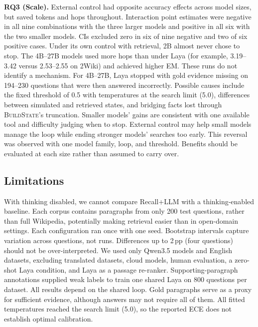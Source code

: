 \textbf{RQ3 (Scale).} External control had opposite accuracy effects across model sizes,
but saved tokens and hops throughout. Interaction point estimates were negative in
all nine combinations with the three larger models and positive in all six with the
two smaller models. CIs excluded zero in six of nine negative and two of six positive
cases. Under its own control with retrieval, 2B almost never chose to stop. The
4B--27B models used more hops than under Laya (for example,
3.19--3.42 versus 2.53--2.55 on 2Wiki) and achieved higher EM. These runs do not
identify a mechanism. For 4B--27B, Laya stopped with gold evidence missing on 194--230
questions that were then answered incorrectly. Possible
causes include the fixed threshold of 0.5 with temperatures at the search limit (5.0),
differences between simulated and retrieved states, and bridging facts lost through
\textsc{BuildState}'s truncation. Smaller models' gains are consistent with one available
tool and difficulty judging when to stop. External control may help small models manage
the loop while ending stronger models' searches too early. This reversal was observed
with one model family, loop, and threshold. Benefits should be evaluated at each size
rather than assumed to carry over.

\subsection{Limitations}
\label{sec:disc:limits}

With thinking disabled, we cannot compare Recall+LLM with a thinking-enabled
baseline. Each corpus contains paragraphs from only 200 test questions, rather than full
Wikipedia, potentially making retrieval easier than in open-domain settings. Each
configuration ran once with one seed. Bootstrap intervals capture variation across
questions, not runs. Differences up to 2\,pp (four questions) should not be
over-interpreted. We used only Qwen3.5 models and English datasets, excluding translated
datasets, cloud models, human evaluation, a zero-shot Laya condition, and Laya as a
passage re-ranker. Supporting-paragraph annotations supplied weak labels to train one
shared Laya on 800 questions per dataset. All results depend on the shared loop. Gold
paragraphs serve as a proxy for sufficient evidence, although answers may not require
all of them. All fitted temperatures reached the search limit (5.0), so the reported
ECE does not establish optimal calibration.
